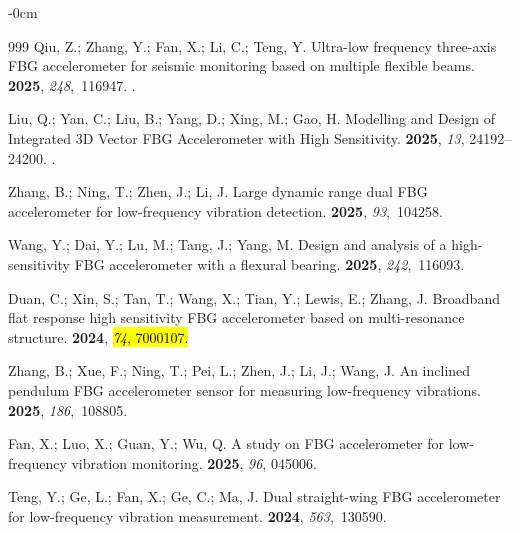 \documentclass[sensors,article,accept,pdftex,moreauthors]{Definitions/mdpi}
\begin{document}
\begin{adjustwidth}{-\extralength}{0cm}
\begin{thebibliography}{999}
Qiu, Z.; Zhang, Y.; Fan, X.; Li, C.; Teng, Y.
\newblock Ultra-low frequency three-axis FBG accelerometer for seismic monitoring based on multiple flexible beams.
 {\bf 2025}, {\em 248},~116947.
.

Liu, Q.; Yan, C.; Liu, B.; Yang, D.; Xing, M.; Gao, H.
\newblock Modelling and Design of Integrated 3D Vector FBG Accelerometer with High Sensitivity.
 {\bf 2025}, \emph{13}, 24192--24200.
.

Zhang, B.; Ning, T.; Zhen, J.; Li, J.
\newblock Large dynamic range dual FBG accelerometer for low-frequency vibration detection.
 {\bf 2025}, {\em 93},~104258.

Wang, Y.; Dai, Y.; Lu, M.; Tang, J.; Yang, M.
\newblock Design and analysis of a high-sensitivity FBG accelerometer with a flexural bearing.
 {\bf 2025}, {\em 242},~116093.

Duan, C.; Xin, S.; Tan, T.; Wang, X.; Tian, Y.; Lewis, E.; Zhang, J.
\newblock Broadband flat response high sensitivity FBG accelerometer based on multi-resonance structure.
 {\bf 2024}, \hl{\emph{74}, 7000107.}

Zhang, B.; Xue, F.; Ning, T.; Pei, L.; Zhen, J.; Li, J.; Wang, J.
\newblock An inclined pendulum FBG accelerometer sensor for measuring low-frequency vibrations.
 {\bf 2025}, {\em 186},~108805.

Fan, X.; Luo, X.; Guan, Y.; Wu, Q.
\newblock A study on FBG accelerometer for low-frequency vibration monitoring.
 {\bf 2025}, {\em 96}, 045006.

Teng, Y.; Ge, L.; Fan, X.; Ge, C.; Ma, J.
\newblock Dual straight-wing FBG accelerometer for low-frequency vibration measurement.
 {\bf 2024}, {\em 563},~130590.


\end{thebibliography}
\end{adjustwidth}
\end{document}
